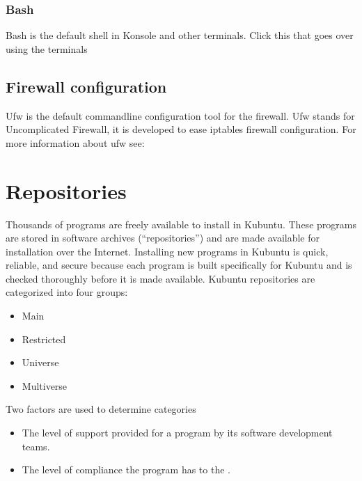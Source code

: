 \documentclass[letterpaper,10pt,english]{sphinxmanual}
\begin{document}
\subsubsection{Bash}
\label{\detokenize{docs/software-management/software:bash}}
\sphinxAtStartPar
Bash is the default shell in Konsole and other terminals. Click this  that goes over using the terminals


\subsection{Firewall configuration}
\label{\detokenize{docs/software-management/software:firewall-configuration}}
\sphinxAtStartPar
Ufw is the default commandline configuration tool for the firewall. Ufw stands for Uncomplicated Firewall, it is developed to ease iptables firewall configuration. For more information about ufw see: 


\section{Repositories}
\label{\detokenize{docs/software-management/repositories:repositories}}\label{\detokenize{docs/software-management/repositories:repositories-link}}\label{\detokenize{docs/software-management/repositories::doc}}
\sphinxAtStartPar
Thousands of programs are freely available to install in Kubuntu. These programs are stored in software archives (“repositories”) and are made available for installation over the Internet. Installing new programs in Kubuntu is quick, reliable, and secure because each program is built specifically for Kubuntu and is checked thoroughly before it is made available. Kubuntu repositories are categorized into four groups:
\begin{itemize}
\item {} 
\sphinxAtStartPar
Main

\item {} 
\sphinxAtStartPar
Restricted

\item {} 
\sphinxAtStartPar
Universe

\item {} 
\sphinxAtStartPar
Multiverse

\end{itemize}

\sphinxAtStartPar
Two factors are used to determine categories
\begin{itemize}
\item {} 
\sphinxAtStartPar
The level of support provided for a program by its software development teams.

\item {} 
\sphinxAtStartPar
The level of compliance the program has to the .

\end{itemize}
\end{document}
